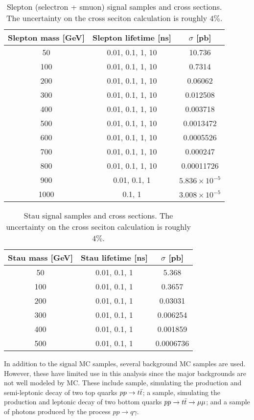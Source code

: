 \begin{table}[htb]
\begin{center}
\begin{tabular}{ccc}
 Slepton mass [GeV] & Slepton lifetime [ns] & $\sigma$ [pb] \\
 \hline
  50   &  0.01, 0.1, 1, 10   & 10.736  \\
  100  &  0.01, 0.1, 1, 10   & 0.7314  \\
  200  &  0.01, 0.1, 1, 10    & 0.06062  \\
  300  &  0.01, 0.1, 1, 10   & 0.012508  \\
  400  & 0.01, 0.1, 1, 10    & 0.003718 \\
  500  &  0.01, 0.1, 1, 10   & 0.0013472  \\
  600  &  0.01, 0.1, 1, 10   & 0.0005526\\
  700  &  0.01, 0.1, 1, 10   & 0.000247  \\
  800  & 0.01, 0.1, 1, 10   & 0.00011726 \\
 900   &  0.01, 0.1, 1      & $5.836 \times 10^{-5}$  \\
 1000  &  0.1, 1            & $3.008\times 10^{-5}$  \\
\hline
\end{tabular}
\caption{Slepton (selectron + smuon) signal samples and cross sections. The uncertainty on the cross seciton calculation is roughly $4\%$.}
\label{tab:dsid_slep}
\end{center}
\end{table}

\begin{table}[htb]
\begin{center}
\begin{tabular}{ccc}
 Stau mass [GeV] & Stau lifetime [ns] & $\sigma$ [pb] \\
 \hline
  50   &  0.01, 0.1, 1   & 5.368  \\
  100  &  0.01, 0.1, 1   & 0.3657  \\
  200  &  0.01, 0.1, 1   & 0.03031  \\
  300  &  0.01, 0.1, 1   & 0.006254  \\
  400  &  0.01, 0.1, 1   & 0.001859 \\
  500  &  0.01, 0.1, 1   & 0.0006736  \\
\hline
\end{tabular}
\caption{Stau signal samples and cross sections. The uncertainty on the cross seciton calculation is roughly $4\%$.}
\label{tab:dsid_stau}
\end{center}
\end{table}




In addition to the signal \ac{MC} samples, several background \ac{MC} samples are used. However, these have limited use in this analysis since the major backgrounds are not well modeled by \ac{MC}. These include \ttbar sample, simulating the production and semi-leptonic decay of two top quarks $pp\rightarrow t\bar{t}$; a \bbmm sample, simulating the production and leptonic decay of two bottom quarks $pp\rightarrow t\bar{t} \rightarrow \mu\mu$; and a sample of photons produced by the process $pp \rightarrow q \gamma$. 




